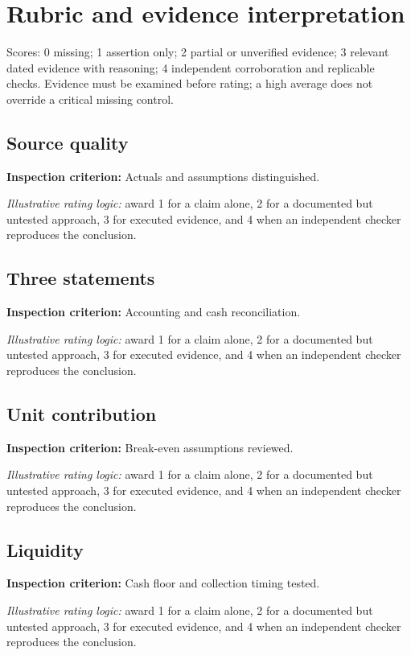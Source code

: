\documentclass[11pt]{article}
\begin{document}
\SuiteOpen
\section{Rubric and evidence interpretation}
Scores: 0 missing; 1 assertion only; 2 partial or unverified evidence; 3 relevant dated evidence with reasoning; 4 independent corroboration and replicable checks. Evidence must be examined before rating; a high average does not override a critical missing control.
\subsection*{Source quality}
\textbf{Inspection criterion:} Actuals and assumptions distinguished.\par\textit{Illustrative rating logic:} award 1 for a claim alone, 2 for a documented but untested approach, 3 for executed evidence, and 4 when an independent checker reproduces the conclusion.\par
\subsection*{Three statements}
\textbf{Inspection criterion:} Accounting and cash reconciliation.\par\textit{Illustrative rating logic:} award 1 for a claim alone, 2 for a documented but untested approach, 3 for executed evidence, and 4 when an independent checker reproduces the conclusion.\par
\subsection*{Unit contribution}
\textbf{Inspection criterion:} Break-even assumptions reviewed.\par\textit{Illustrative rating logic:} award 1 for a claim alone, 2 for a documented but untested approach, 3 for executed evidence, and 4 when an independent checker reproduces the conclusion.\par
\subsection*{Liquidity}
\textbf{Inspection criterion:} Cash floor and collection timing tested.\par\textit{Illustrative rating logic:} award 1 for a claim alone, 2 for a documented but untested approach, 3 for executed evidence, and 4 when an independent checker reproduces the conclusion.\par
\end{document}
